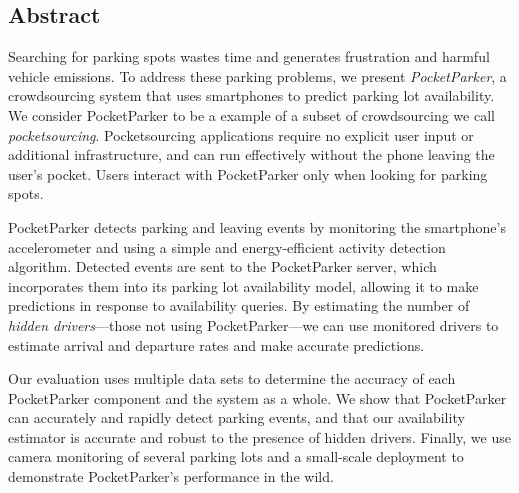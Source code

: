\subsection*{Abstract}

Searching for parking spots wastes time and generates frustration and harmful
vehicle emissions. To address these parking problems, we present
\textit{PocketParker}, a crowdsourcing system that uses smartphones to
predict parking lot availability. We consider PocketParker to be a example of
a subset of crowdsourcing we call \textit{pocketsourcing}. Pocketsourcing
applications require no explicit user input or additional infrastructure, and
can run effectively without the phone leaving the user's pocket. Users
interact with PocketParker only when looking for parking spots.

PocketParker detects parking and leaving events by monitoring the
smartphone's accelerometer and using a simple and energy-efficient activity
detection algorithm. Detected events are sent to the PocketParker server,
which incorporates them into its parking lot availability model, allowing it
to make predictions in response to availability queries. By estimating the
number of \textit{hidden drivers}---those not using PocketParker---we can use
monitored drivers to estimate arrival and departure rates and make accurate
predictions.

Our evaluation uses multiple data sets to determine the accuracy of each
PocketParker component and the system as a whole. We show that PocketParker
can accurately and rapidly detect parking events, and that our availability
estimator is accurate and robust to the presence of hidden drivers. Finally,
we use camera monitoring of several parking lots and a small-scale deployment
to demonstrate PocketParker's performance in the wild.
